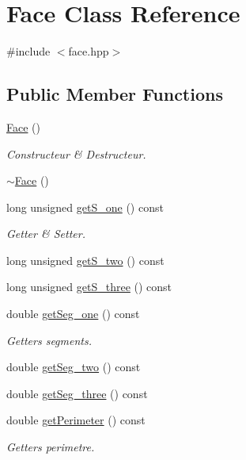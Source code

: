 \hypertarget{class_face}{\section{Face Class Reference}
\label{class_face}
}


{\ttfamily \#include $<$face.\-hpp$>$}

\subsection*{Public Member Functions}
\begin{DoxyCompactItemize}
\item 
\hyperlink{class_face_afdb634bc2d5287ba0d62e46b57e9dc2e}{Face} ()
\begin{DoxyCompactList}\small\item\em Constructeur \& Destructeur. \end{DoxyCompactList}\item 
\hyperlink{class_face_a182c8c9ba652d46b01fdf6816cd65590}{$\sim$\-Face} ()
\item 
long unsigned \hyperlink{class_face_a6a71144fe15d6edfab4cec3560bdb2aa}{get\-S\-\_\-one} () const 
\begin{DoxyCompactList}\small\item\em Getter \& Setter. \end{DoxyCompactList}\item 
long unsigned \hyperlink{class_face_a5b35ec67e75df789092301fab06a951b}{get\-S\-\_\-two} () const 
\item 
long unsigned \hyperlink{class_face_adddc2b56135f76b623a4ffa9b7c0953f}{get\-S\-\_\-three} () const 
\item 
double \hyperlink{class_face_a906d16f2f1c9adbe881ae46ee7f3e3e9}{get\-Seg\-\_\-one} () const 
\begin{DoxyCompactList}\small\item\em Getters segments. \end{DoxyCompactList}\item 
double \hyperlink{class_face_a50a58b3b43a78239defee57e7202968e}{get\-Seg\-\_\-two} () const 
\item 
double \hyperlink{class_face_a19bb64415987240d90a1ec86d2432f05}{get\-Seg\-\_\-three} () const 
\item 
double \hyperlink{class_face_acd3e36c17c14b6617d92b0b9ecb2b6fc}{get\-Perimeter} () const 
\begin{DoxyCompactList}\small\item\em Getters perimetre. \end{DoxyCompactList}\item 

\end{DoxyCompactItemize}
